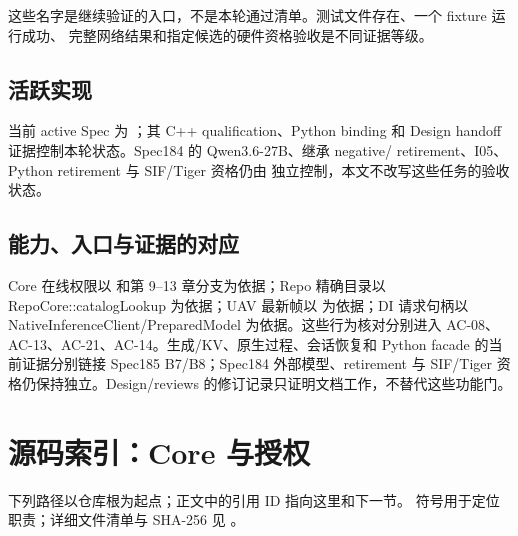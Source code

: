 这些名字是继续验证的入口，不是本轮通过清单。测试文件存在、一个 fixture 运行成功、
完整网络结果和指定候选的硬件资格验收是不同证据等级。

\subsection{活跃实现}
当前 active Spec 为 ；其 C++ qualification、Python
binding 和 Design handoff 证据控制本轮状态。Spec184 的 Qwen3.6-27B、继承 negative/
retirement、I05、Python retirement 与 SIF/Tiger 资格仍由
 独立控制，本文不改写这些任务的验收状态。



\subsection{能力、入口与证据的对应}
Core 在线权限以  和第 9–13 章分支为依据；Repo 精确目录以 RepoCore::catalogLookup 为依据；UAV 最新帧以  为依据；DI 请求句柄以 NativeInferenceClient/PreparedModel 为依据。这些行为核对分别进入 AC-08、AC-13、AC-21、AC-14。生成/KV、原生过程、会话恢复和 Python facade 的当前证据分别链接 Spec185 B7/B8；Spec184 外部模型、retirement 与 SIF/Tiger 资格仍保持独立。Design/reviews 的修订记录只证明文档工作，不替代这些功能门。

\newpage

\section{源码索引：Core 与授权}
下列路径以仓库根为起点；正文中的引用 ID 指向这里和下一节。
符号用于定位职责；详细文件清单与 SHA-256 见 。

